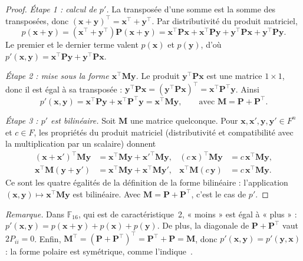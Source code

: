 \begin{proof}
\emph{Étape 1 : calcul de $p'$.} La transposée d'une somme est la somme des transposées, donc $(\mathbf{x}+\mathbf{y})^{\top}=\mathbf{x}^{\top}+\mathbf{y}^{\top}$. Par distributivité du produit matriciel,
\[p(\mathbf{x}+\mathbf{y})=(\mathbf{x}^{\top}+\mathbf{y}^{\top})\mathbf{P}(\mathbf{x}+\mathbf{y})=\mathbf{x}^{\top}\mathbf{P}\mathbf{x}+\mathbf{x}^{\top}\mathbf{P}\mathbf{y}+\mathbf{y}^{\top}\mathbf{P}\mathbf{x}+\mathbf{y}^{\top}\mathbf{P}\mathbf{y}.\]
Le premier et le dernier terme valent $p(\mathbf{x})$ et $p(\mathbf{y})$, d'où $p'(\mathbf{x},\mathbf{y})=\mathbf{x}^{\top}\mathbf{P}\mathbf{y}+\mathbf{y}^{\top}\mathbf{P}\mathbf{x}$.

\emph{Étape 2 : mise sous la forme $\mathbf{x}^{\top}\mathbf{M}\mathbf{y}$.} Le produit $\mathbf{y}^{\top}\mathbf{P}\mathbf{x}$ est une matrice $1\times1$, donc il est égal à sa transposée : $\mathbf{y}^{\top}\mathbf{P}\mathbf{x}=(\mathbf{y}^{\top}\mathbf{P}\mathbf{x})^{\top}=\mathbf{x}^{\top}\mathbf{P}^{\top}\mathbf{y}$. Ainsi
\[p'(\mathbf{x},\mathbf{y})=\mathbf{x}^{\top}\mathbf{P}\mathbf{y}+\mathbf{x}^{\top}\mathbf{P}^{\top}\mathbf{y}=\mathbf{x}^{\top}\mathbf{M}\mathbf{y},\qquad\text{avec }\mathbf{M}=\mathbf{P}+\mathbf{P}^{\top}.\]

\emph{Étape 3 : $p'$ est bilinéaire.} Soit $\mathbf{M}$ une matrice quelconque. Pour $\mathbf{x},\mathbf{x}',\mathbf{y},\mathbf{y}'\in F^n$ et $c\in F$, les propriétés du produit matriciel (distributivité et compatibilité avec la multiplication par un scalaire) donnent
\begin{align*}
(\mathbf{x}+\mathbf{x}')^{\top}\mathbf{M}\mathbf{y}&=\mathbf{x}^{\top}\mathbf{M}\mathbf{y}+\mathbf{x}'^{\top}\mathbf{M}\mathbf{y}, & (c\,\mathbf{x})^{\top}\mathbf{M}\mathbf{y}&=c\,\mathbf{x}^{\top}\mathbf{M}\mathbf{y},\\
\mathbf{x}^{\top}\mathbf{M}(\mathbf{y}+\mathbf{y}')&=\mathbf{x}^{\top}\mathbf{M}\mathbf{y}+\mathbf{x}^{\top}\mathbf{M}\mathbf{y}', & \mathbf{x}^{\top}\mathbf{M}(c\,\mathbf{y})&=c\,\mathbf{x}^{\top}\mathbf{M}\mathbf{y}.
\end{align*}
Ce sont les quatre égalités de la définition de la forme bilinéaire : l'application $(\mathbf{x},\mathbf{y})\mapsto\mathbf{x}^{\top}\mathbf{M}\mathbf{y}$ est bilinéaire. Avec $\mathbf{M}=\mathbf{P}+\mathbf{P}^{\top}$, c'est le cas de $p'$.
\end{proof}
\emph{Remarque.} Dans $\mathbb{F}_{16}$, qui est de caractéristique~2, « moins » est égal à « plus » : $p'(\mathbf{x},\mathbf{y})=p(\mathbf{x}+\mathbf{y})+p(\mathbf{x})+p(\mathbf{y})$. De plus, la diagonale de $\mathbf{P}+\mathbf{P}^{\top}$ vaut $2P_{ii}=0$.
Enfin, $\mathbf{M}^{\top}=(\mathbf{P}+\mathbf{P}^{\top})^{\top}=\mathbf{P}^{\top}+\mathbf{P}=\mathbf{M}$, donc $p'(\mathbf{x},\mathbf{y})=p'(\mathbf{y},\mathbf{x})$ : la forme polaire est symétrique, comme l'indique~\cite{mayo}.

